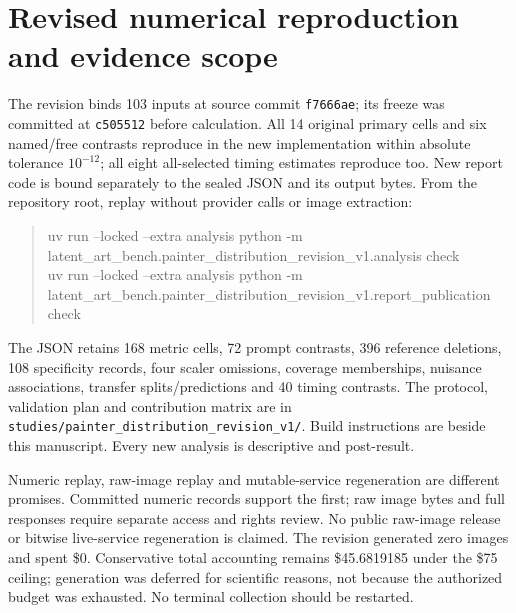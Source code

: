 \section{Revised numerical reproduction and evidence scope}
The revision binds 103 inputs at source commit \texttt{f7666ae}; its freeze was
committed at \texttt{c505512} before calculation. All 14 original primary cells
and six named/free contrasts reproduce in the new implementation within absolute
tolerance $10^{-12}$; all eight all-selected timing estimates reproduce too.
New report code is bound separately to the sealed JSON and its output bytes.
From the repository root, replay without provider calls or image extraction:
\begin{quote}\small\ttfamily
uv run --locked --extra analysis python -m\\
latent\_art\_bench.painter\_distribution\_revision\_v1.analysis check\\[4pt]
uv run --locked --extra analysis python -m\\
latent\_art\_bench.painter\_distribution\_revision\_v1.report\_publication check
\end{quote}
The JSON retains 168 metric cells, 72 prompt contrasts, 396 reference deletions,
108 specificity records, four scaler omissions, coverage memberships, nuisance
associations, transfer splits/predictions and 40 timing contrasts. The protocol,
validation plan and contribution matrix are in
\texttt{studies/painter\_distribution\_revision\_v1/}. Build instructions are
beside this manuscript. Every new analysis is descriptive and post-result.

Numeric replay, raw-image replay and mutable-service regeneration are different
promises. Committed numeric records support the first; raw image bytes and full
responses require separate access and rights review. No public raw-image release
or bitwise live-service regeneration is claimed. The revision generated zero
images and spent \$0. Conservative total accounting remains \$45.6819185 under
the \$75 ceiling; generation was deferred for scientific reasons, not because
the authorized budget was exhausted. No terminal collection should be restarted.
